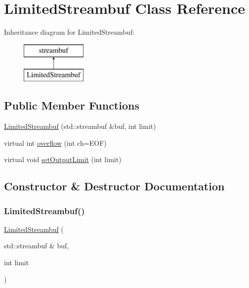 \hypertarget{classplainconsole_1_1LimitedStreambuf}{}\section{Limited\+Streambuf Class Reference}
\label{classplainconsole_1_1LimitedStreambuf}
Inheritance diagram for Limited\+Streambuf\+:\begin{figure}[H]
\begin{center}
\leavevmode
\includegraphics[height=2.000000cm]{classplainconsole_1_1LimitedStreambuf}
\end{center}
\end{figure}
\subsection*{Public Member Functions}
\begin{DoxyCompactItemize}
\item 
\mbox{\hyperlink{classplainconsole_1_1LimitedStreambuf_a9574495abccc9097ec2e527222e0649f}{Limited\+Streambuf}} (std\+::streambuf \&buf, int limit)
\item 
virtual int \mbox{\hyperlink{classplainconsole_1_1LimitedStreambuf_adccb3cd5475ba3c83bc2b0a8cbd731c0}{overflow}} (int ch=E\+OF)
\item 
virtual void \mbox{\hyperlink{classplainconsole_1_1LimitedStreambuf_a86854533b6acdbe6b6d23051f53c64f6}{set\+Output\+Limit}} (int limit)
\end{DoxyCompactItemize}


\subsection{Constructor \& Destructor Documentation}
\mbox{\label{classplainconsole_1_1LimitedStreambuf_a9574495abccc9097ec2e527222e0649f}} 
\subsubsection{\texorpdfstring{Limited\+Streambuf()}{LimitedStreambuf()}}
{\footnotesize\ttfamily \mbox{\hyperlink{classplainconsole_1_1LimitedStreambuf}{Limited\+Streambuf}} (\begin{DoxyParamCaption}\item[{std\+::streambuf \&}]{buf,  }\item[{int}]{limit }\end{DoxyParamCaption})\hspace{0.3cm}{\ttfamily [inline]}}



